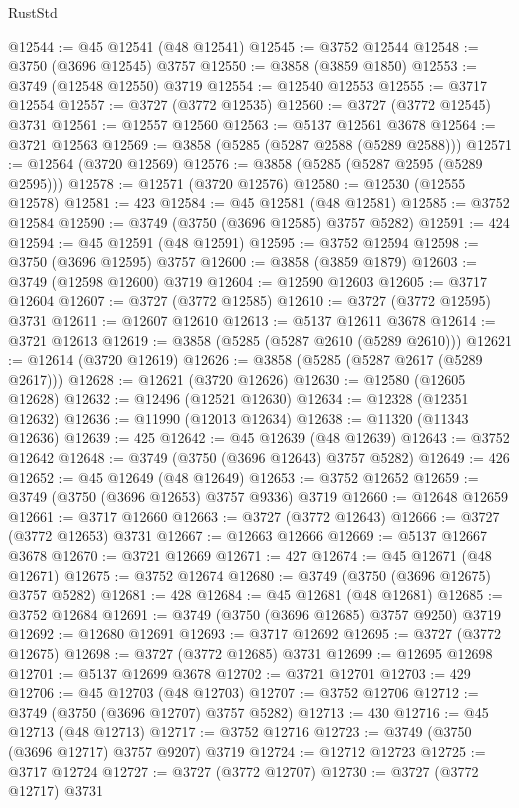 \begin{lexlean}{RustStd}
\begin{coremodule}
@12544 := @45 @12541 (@48 @12541)
@12545 := @3752 @12544
@12548 := @3750 (@3696 @12545) @3757
@12550 := @3858 (@3859 @1850)
@12553 := @3749 (@12548 @12550) @3719
@12554 := @12540 @12553
@12555 := @3717 @12554
@12557 := @3727 (@3772 @12535)
@12560 := @3727 (@3772 @12545) @3731
@12561 := @12557 @12560
@12563 := @5137 @12561 @3678
@12564 := @3721 @12563
@12569 := @3858 (@5285 (@5287 @2588 (@5289 @2588)))
@12571 := @12564 (@3720 @12569)
@12576 := @3858 (@5285 (@5287 @2595 (@5289 @2595)))
@12578 := @12571 (@3720 @12576)
@12580 := @12530 (@12555 @12578)
@12581 := 423
@12584 := @45 @12581 (@48 @12581)
@12585 := @3752 @12584
@12590 := @3749 (@3750 (@3696 @12585) @3757 @5282)
@12591 := 424
@12594 := @45 @12591 (@48 @12591)
@12595 := @3752 @12594
@12598 := @3750 (@3696 @12595) @3757
@12600 := @3858 (@3859 @1879)
@12603 := @3749 (@12598 @12600) @3719
@12604 := @12590 @12603
@12605 := @3717 @12604
@12607 := @3727 (@3772 @12585)
@12610 := @3727 (@3772 @12595) @3731
@12611 := @12607 @12610
@12613 := @5137 @12611 @3678
@12614 := @3721 @12613
@12619 := @3858 (@5285 (@5287 @2610 (@5289 @2610)))
@12621 := @12614 (@3720 @12619)
@12626 := @3858 (@5285 (@5287 @2617 (@5289 @2617)))
@12628 := @12621 (@3720 @12626)
@12630 := @12580 (@12605 @12628)
@12632 := @12496 (@12521 @12630)
@12634 := @12328 (@12351 @12632)
@12636 := @11990 (@12013 @12634)
@12638 := @11320 (@11343 @12636)
@12639 := 425
@12642 := @45 @12639 (@48 @12639)
@12643 := @3752 @12642
@12648 := @3749 (@3750 (@3696 @12643) @3757 @5282)
@12649 := 426
@12652 := @45 @12649 (@48 @12649)
@12653 := @3752 @12652
@12659 := @3749 (@3750 (@3696 @12653) @3757 @9336) @3719
@12660 := @12648 @12659
@12661 := @3717 @12660
@12663 := @3727 (@3772 @12643)
@12666 := @3727 (@3772 @12653) @3731
@12667 := @12663 @12666
@12669 := @5137 @12667 @3678
@12670 := @3721 @12669
@12671 := 427
@12674 := @45 @12671 (@48 @12671)
@12675 := @3752 @12674
@12680 := @3749 (@3750 (@3696 @12675) @3757 @5282)
@12681 := 428
@12684 := @45 @12681 (@48 @12681)
@12685 := @3752 @12684
@12691 := @3749 (@3750 (@3696 @12685) @3757 @9250) @3719
@12692 := @12680 @12691
@12693 := @3717 @12692
@12695 := @3727 (@3772 @12675)
@12698 := @3727 (@3772 @12685) @3731
@12699 := @12695 @12698
@12701 := @5137 @12699 @3678
@12702 := @3721 @12701
@12703 := 429
@12706 := @45 @12703 (@48 @12703)
@12707 := @3752 @12706
@12712 := @3749 (@3750 (@3696 @12707) @3757 @5282)
@12713 := 430
@12716 := @45 @12713 (@48 @12713)
@12717 := @3752 @12716
@12723 := @3749 (@3750 (@3696 @12717) @3757 @9207) @3719
@12724 := @12712 @12723
@12725 := @3717 @12724
@12727 := @3727 (@3772 @12707)
@12730 := @3727 (@3772 @12717) @3731

\end{coremodule}
\end{lexlean}
